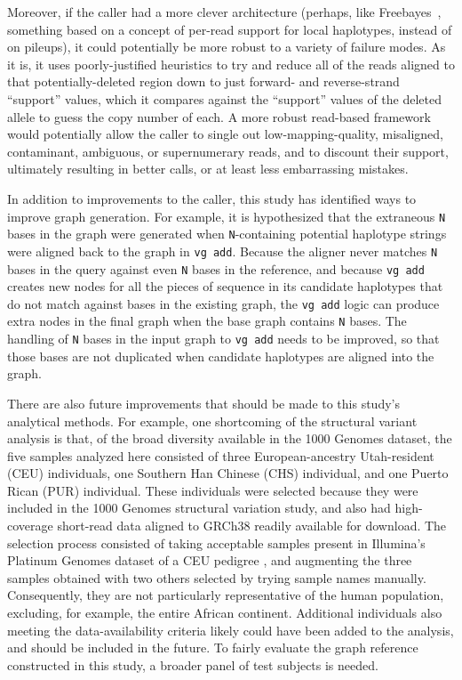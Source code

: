 Moreover, if the caller had a more clever architecture (perhaps, like Freebayes~\cite{garrison2012haplotype}, something based on a concept of per-read support for local haplotypes, instead of on pileups), it could potentially be more robust to a variety of failure modes. As it is, it uses poorly-justified heuristics to try and reduce all of the reads aligned to that potentially-deleted region down to just forward- and reverse-strand ``support'' values, which it compares against the ``support'' values of the deleted allele to guess the copy number of each. A more robust read-based framework would potentially allow the caller to single out low-mapping-quality, misaligned, contaminant, ambiguous, or supernumerary reads, and to discount their support, ultimately resulting in better calls, or at least less embarrassing mistakes.

In addition to improvements to the caller, this study has identified ways to improve graph generation. For example, it is hypothesized that the extraneous \texttt{N} bases in the graph were generated when \texttt{N}-containing potential haplotype strings were aligned back to the graph in \texttt{vg add}. Because the \vg aligner never matches \texttt{N} bases in the query against even \texttt{N} bases in the reference, and because \texttt{vg add} creates new nodes for all the pieces of sequence in its candidate haplotypes that do not match against bases in the existing graph, the \texttt{vg add} logic can produce extra nodes in the final graph when the base graph contains \texttt{N} bases. The handling of \texttt{N} bases in the input graph to \texttt{vg add} needs to be improved, so that those bases are not duplicated when candidate haplotypes are aligned into the graph. 

There are also future improvements that should be made to this study's analytical methods. For example, one shortcoming of the structural variant analysis is that, of the broad diversity available in the 1000 Genomes dataset, the five samples analyzed here consisted of three European-ancestry Utah-resident (CEU) individuals, one Southern Han Chinese (CHS) individual, and one Puerto Rican (PUR) individual. These individuals were selected because they were included in the 1000 Genomes structural variation study, and also had high-coverage short-read data aligned to GRCh38 readily available for download. The selection process consisted of taking acceptable samples present in Illumina's Platinum Genomes dataset of a CEU pedigree \cite{eberle2013platinum}, and augmenting the three samples obtained with two others selected by trying sample names manually. Consequently, they are not particularly representative of the human population, excluding, for example, the entire African continent. Additional individuals also meeting the data-availability criteria likely could have been added to the analysis, and should be included in the future. To fairly evaluate the graph reference constructed in this study, a broader panel of test subjects is needed.

